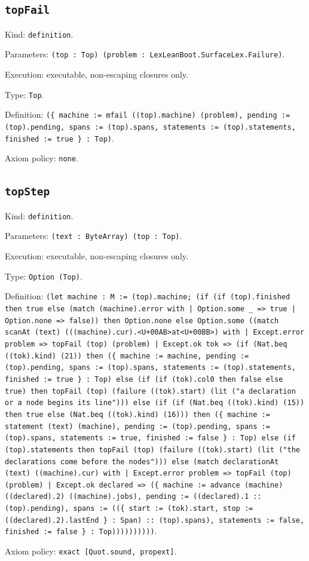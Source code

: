 \documentclass[11pt]{article}
\begin{document}
\subsection*{\texttt{topFail}}
\noindent Kind: \texttt{definition}.\par
\noindent Parameters: \texttt{(top : Top) (problem : LexLeanBoot.SurfaceLex.Failure)}.\par
\noindent Execution: executable, non-escaping closures only.\par
\noindent Type: \texttt{Top}.\par
\noindent Definition: \texttt{(\{ machine := mfail ((top).machine) (problem), pending := (top).pending, spans := (top).spans, statements := (top).statements, finished := true \} : Top)}.\par
\noindent Axiom policy: \texttt{none}.\par
\subsection*{\texttt{topStep}}
\noindent Kind: \texttt{definition}.\par
\noindent Parameters: \texttt{(text : ByteArray) (top : Top)}.\par
\noindent Execution: executable, non-escaping closures only.\par
\noindent Type: \texttt{Option (Top)}.\par
\noindent Definition: \texttt{(let machine : M := (top).machine; (if (if (top).finished then true else (match (machine).error with | Option.some \_ => true | Option.none => false)) then Option.none else Option.some ((match scanAt (text) (((machine).cur).<U+00AB>at<U+00BB>) with | Except.error problem => topFail (top) (problem) | Except.ok tok => (if (Nat.beq ((tok).kind) (21)) then (\{ machine := machine, pending := (top).pending, spans := (top).spans, statements := (top).statements, finished := true \} : Top) else (if (if (tok).col0 then false else true) then topFail (top) (failure ((tok).start) (lit ("a declaration or a node begins its line"))) else (if (if (Nat.beq ((tok).kind) (15)) then true else (Nat.beq ((tok).kind) (16))) then (\{ machine := statement (text) (machine), pending := (top).pending, spans := (top).spans, statements := true, finished := false \} : Top) else (if (top).statements then topFail (top) (failure ((tok).start) (lit ("the declarations come before the nodes"))) else (match declarationAt (text) ((machine).cur) with | Except.error problem => topFail (top) (problem) | Except.ok declared => (\{ machine := advance (machine) ((declared).2) ((machine).jobs), pending := ((declared).1 :: (top).pending), spans := ((\{ start := (tok).start, stop := ((declared).2).lastEnd \} : Span) :: (top).spans), statements := false, finished := false \} : Top))))))))))}.\par
\noindent Axiom policy: \texttt{exact [Quot.sound, propext]}.\par
\end{document}
